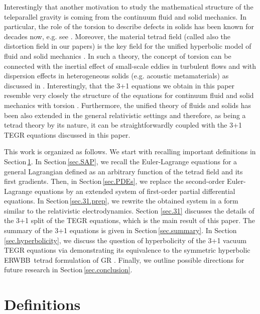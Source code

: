 \documentclass[
10pt, %
a4paper, %
oneside, %
twocolumn,
headinclude,footinclude, %
BCOR5mm, %
]{scrartcl}
\newcommand{\ERWBB}{{ERWBB}}
\begin{document}
	
	Interestingly that another motivation to study the mathematical structure of
	the teleparallel gravity is coming from the continuum fluid and solid
	mechanics. In particular, the role of the torsion to describe defects in
	solids has been known for decades now, e.g. see
	\cite{VolovichKatanaev1992,Hehl2007,Yavari2012,NguyenLeMarrec2022,Bohmer2020,Lychev2022}.
	Moreover, the material tetrad field (called also the distortion field in our
	papers) is the key field for the unified hyperbolic model of fluid and solid
	mechanics \cite{HPR2016,DPRZ2016}. In such a theory, the concept of torsion
	can be connected with the inertial effect of small-scale eddies in turbulent
	flows and with dispersion effects in heterogeneous solids (e.g. acoustic
	metamaterials) as discussed in \cite{Torsion2019}. Interestingly, that the
	3+1 equations we obtain in this paper resemble very closely the structure
	of the equations for continuum fluid and solid mechanics with torsion
	\cite{Torsion2019}. Furthermore, the unified theory of fluids and solids has
	been also extended in the general relativistic settings \cite{PTRSA2020} and
	therefore, as being a tetrad theory by its nature, it can be
	straightforwardly coupled with the 3+1 TEGR equations discussed in this
	paper.

	This work is organized as follows. We start with recalling important
	definitions in Section\,\ref{sec.def}. In Section\,\ref{sec.SAP}, we recall
	the Euler-Lagrange equations for a general Lagrangian defined as an
	arbitrary function of the tetrad field and its first gradients. Then, in
	Section\,\ref{sec.PDEs}, we replace the second-order Euler-Lagrange
	equations by an extended system of first-order partial differential
	equations. In Section\,\ref{sec.31.prep}, we rewrite the obtained system in
	a form similar to the relativistic electrodynamics. Section \ref{sec.31} discusses the details of the 3+1 split of the TEGR equations, which is the main result of this paper. The summary of the 3+1 equations is given in Section\,\ref{sec.summary}. In Section\,\ref{sec.hyperbolicity}, we discuss the question of hyperbolicity of the 3+1 vacuum TEGR equations via demonstrating its equivalence to the symmetric hyperbolic \ERWBB\ tetrad formulation of GR \cite{Estabrook1997,Buchman2003}. Finally, we outline possible directions for future research in Section\,\ref{sec.conclusion}.

	\section{Definitions}\label{sec.def}
	
\end{document}
